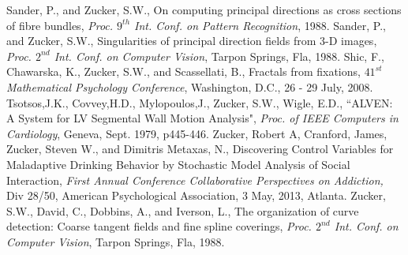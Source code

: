 Sander, P., and Zucker, S.W., On computing principal directions as cross sections of fibre bundles, {\it Proc. $9^{th}$ Int. Conf. on Pattern Recognition}, 1988.
Sander, P., and Zucker, S.W., Singularities of principal direction fields from 3-D images, {\it Proc. $2^{nd}$ Int. Conf. on Computer Vision}, Tarpon Springs, Fla, 1988.
Shic, F., Chawarska, K., Zucker, S.W., and Scassellati, B., Fractals from fixations, {\em $41^{st}$ Mathematical Psychology Conference}, Washington, D.C., 26 - 29 July, 2008.
Tsotsos,J.K., Covvey,H.D., Mylopoulos,J., Zucker, S.W., Wigle, E.D.,  ``ALVEN: A System for LV Segmental Wall Motion Analysis", {\it Proc. of IEEE Computers in Cardiology}, Geneva, Sept. 1979, p445-446.
Zucker, Robert A,  Cranford, James, Zucker, Steven W., and Dimitris Metaxas, N., Discovering Control Variables for Maladaptive Drinking Behavior by Stochastic Model Analysis of Social Interaction, {\em First Annual Conference Collaborative Perspectives on Addiction,} Div 28/50, American Psychological Association, 3 May, 2013, Atlanta.
Zucker, S.W., David, C., Dobbins, A., and Iverson, L., The organization of curve detection: Coarse tangent fields and fine spline coverings, {\it Proc. $2^{nd}$ Int. Conf. on Computer Vision}, Tarpon Springs, Fla, 1988.
